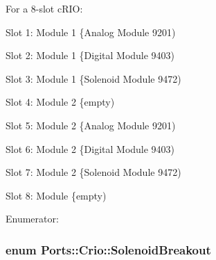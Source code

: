 \-For a 8-\/slot c\-R\-I\-O\-:
\begin{DoxyItemize}
\item \-Slot 1\-: \-Module 1 \{\-Analog \-Module 9201)
\item \-Slot 2\-: \-Module 1 \{\-Digital \-Module 9403)
\item \-Slot 3\-: \-Module 1 \{\-Solenoid \-Module 9472)
\item \-Slot 4\-: \-Module 2 \{empty)
\item \-Slot 5\-: \-Module 2 \{\-Analog \-Module 9201)
\item \-Slot 6\-: \-Module 2 \{\-Digital \-Module 9403)
\item \-Slot 7\-: \-Module 2 \{\-Solenoid \-Module 9472)
\item \-Slot 8\-: \-Module \{empty) 
\end{DoxyItemize}\begin{Desc}
\item[\-Enumerator\-: ]\par
\begin{description}
\item[{\em 
\hypertarget{namespace_ports_1_1_crio_aa86b9e625abfa5049c7e1570b31cc56eaff122a0610e9c70a88c7f7f1d67efe65}{\-Module1}\label{namespace_ports_1_1_crio_aa86b9e625abfa5049c7e1570b31cc56eaff122a0610e9c70a88c7f7f1d67efe65}
}]\item[{\em 
\hypertarget{namespace_ports_1_1_crio_aa86b9e625abfa5049c7e1570b31cc56ea914ea7bcb2f017abbfb257a9a3d91766}{\-Module2}\label{namespace_ports_1_1_crio_aa86b9e625abfa5049c7e1570b31cc56ea914ea7bcb2f017abbfb257a9a3d91766}
}]\end{description}
\end{Desc}

\hypertarget{namespace_ports_1_1_crio_a22e0c5a7a7529735b35a09e0f727cf72}{
\subsubsection[{\-Solenoid\-Breakout}]{\setlength{\rightskip}{0pt plus 5cm}enum {\bf \-Ports\-::\-Crio\-::\-Solenoid\-Breakout}}}\label{namespace_ports_1_1_crio_a22e0c5a7a7529735b35a09e0f727cf72}


